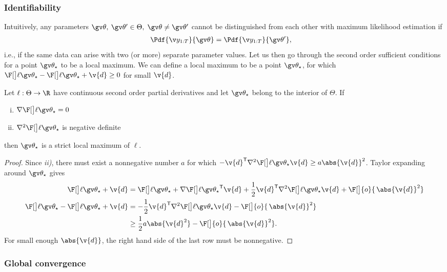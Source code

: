 \subsubsection{Identifiability}

Intuitively, any parameters $\Th,\:\Th' \in \Theta,\; \Th \not= \Th'$ cannot be distinguished
from each other with maximum likelihood estimation if
\begin{align}
	\Pdf{\Y}{\Th}&=\Pdf{\Y}{\Th'},
\end{align}
i.e., if the same data can arise with two (or more) separate
parameter values. Let us then go through the second order sufficient conditions
for a point $\Th_\star$ to be a local maximum. We can define a local maximum
to be a point $\Th_\star$, for which $\lLH[\Th_\star]-\lLH[\Th_\star+\v{d}] \geq 0$ for small $\v{d}$.

\begin{proposition}\label{prop:cond_for_max}
Let $\ell:\Theta \to \R$ have continuous second order partial derivatives and let $\Th_\star$
belong to the interior of $\Theta$. If
\begin{enumerate}[i)] \addtolength{\leftskip}{1cm} \itemsep1pt \parskip0pt 
  \item $\nabla\lLH[\Th_\star] =0$ 
  \item $\nabla^2\lLH[\Th_\star]$ is negative definite
\end{enumerate}
then $\Th_\star$ is a strict local maximum of $\ell$.
\end{proposition}
 \begin{proof}
 Since \textit{ii)}, there must exist a nonnegative number $a$ for which 
 $-\v{d}^\tr\nabla^2\lLH[\Th_\star]\v{d} \geq a\abs{\v{d}}^2$.
 Taylor expanding around $\Th_\star$ gives
 \begin{align*}
	\lLH[\Th_\star+\v{d}] &= \lLH[\Th_\star]+\nabla\lLH[\Th_\star]^\tr\v{d}+\frac{1}{2}\v{d}^\tr\nabla^2\lLH[\Th_\star]\v{d}+\F[\big]{o}{\,\abs{\v{d}}^2}\\
	\lLH[\Th_\star]-\lLH[\Th_\star+\v{d}] &= -\frac{1}{2}\v{d}^\tr\nabla^2\lLH[\Th_\star]\v{d}-\F[\big]{o}{\,\abs{\v{d}}^2}\\
	&\geq \frac{1}{2}a\abs{\v{d}^2}-\F[\big]{o}{\,\abs{\v{d}}^2}.
\end{align*}
For small enough $\abs{\v{d}}$, the right hand side of the last row must be nonnegative.
 \end{proof}

\subsubsection{Global convergence}

